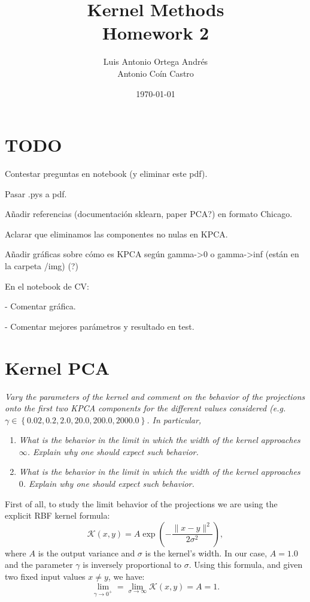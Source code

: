 \documentclass[11pt]{article}
\author{Luis Antonio Ortega Andrés\\Antonio Coín Castro}
\date{\today}
\title{Kernel Methods\\\medskip
\large Homework 2}
\begin{document}
\maketitle

\section{TODO}

Contestar preguntas en notebook (y eliminar este pdf).

Pasar .pys a pdf.

Añadir referencias (documentación sklearn, paper PCA?) en formato Chicago.

Aclarar que eliminamos las componentes no nulas en KPCA.

Añadir gráficas sobre cómo es KPCA según gamma->0 o gamma->inf (están en la carpeta /img) (?)

En el notebook de CV:

- Comentar gráfica.

- Comentar mejores parámetros y resultado en test.

\section*{Kernel PCA}



\emph{Vary the parameters of the kernel and comment on the behavior of the projections onto the first two KPCA components for the different values considered (e.g. $\gamma \in \left\{0.02, 0.2, 2.0, 20.0, 200.0, 2000.0\right\}$. In particular,}
\begin{enumerate}
    \item \emph{What is the behavior in the limit in which the width of the kernel approaches $\infty$. Explain why one should expect such behavior.}
    \item \emph{What is the behavior in the limit in which the width of the kernel approaches $0$. Explain why one should expect such behavior.}
\end{enumerate}

First of all, to study the limit behavior of the projections we are using the explicit RBF kernel formula:
\[
     \mathcal{K}(x, y) = A\exp\left(-\frac{\|x-y\|^{2}}{2 \sigma^2}\right),
\]
where \( A \) is the output variance and \( \sigma \) is the kernel's width. In our case, $A=1.0$ and the parameter \( \gamma \) is inversely proportional to \( \sigma \). Using this formula, and given two fixed input values \( x \neq y \), we have:
\[
     \lim_{\gamma \to 0^{+}} = \lim_{\sigma \to \infty} \mathcal{K}(x,y) = A=1.
\]
\end{document}
